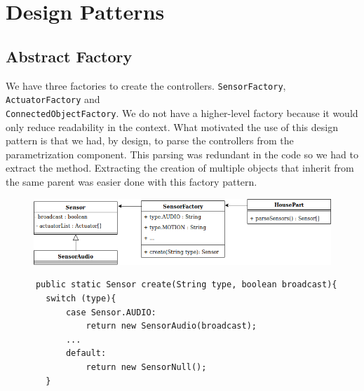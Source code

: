   \section{Design Patterns}
    \subsection{Abstract Factory}
      We have three factories to create the controllers. \texttt{SensorFactory}, \texttt{ActuatorFactory} and \\ \texttt{ConnectedObjectFactory}. We do not have a higher-level factory because it would only reduce readability in the context. What motivated the use of this design pattern is that we had, by design, to parse the controllers from the parametrization component. This parsing was redundant in the code so we had to extract the method. Extracting the creation of multiple objects that inherit from the same parent was easier done with this factory pattern.
      \begin{figure}[!h]
        \includegraphics[width=\textwidth]{sensorfactory.png}
      \end{figure}
      \begin{verbatim}
      public static Sensor create(String type, boolean broadcast){
        switch (type){
            case Sensor.AUDIO:
                return new SensorAudio(broadcast);
            ...
            default:
                return new SensorNull();
        }
      \end{verbatim}

